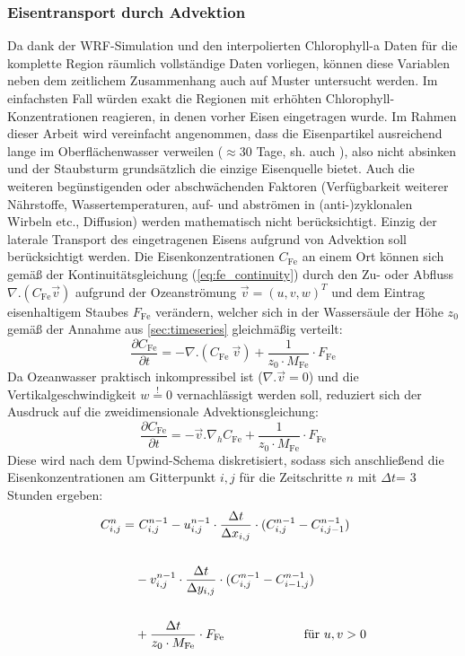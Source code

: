 \documentclass[12pt,a4paper,onecolumn,headheight=30pt]{scrartcl}
\begin{document}
\subsubsection{Eisentransport durch Advektion} \label{sec:methods_advection}
Da dank der WRF-Simulation und den interpolierten Chlorophyll-a Daten \citep{Saulquin.2019} für die komplette Region räumlich vollständige Daten vorliegen, können diese Variablen neben dem zeitlichem Zusammenhang auch auf Muster untersucht werden. Im einfachsten Fall würden exakt die Regionen mit erhöhten Chlorophyll-Konzentrationen reagieren, in denen vorher Eisen eingetragen wurde. Im Rahmen dieser Arbeit wird vereinfacht angenommen, dass die Eisenpartikel ausreichend lange im Oberflächenwasser verweilen ($\approx$30 Tage, sh. auch \citet{Cropp.2013}), also nicht absinken und der Staubsturm grundsätzlich die einzige Eisenquelle bietet. Auch die weiteren begünstigenden oder abschwächenden Faktoren (Verfügbarkeit weiterer Nährstoffe, Wassertemperaturen, auf- und abströmen in (anti-)zyklonalen Wirbeln etc., Diffusion) werden mathematisch nicht berücksichtigt. Einzig der laterale Transport des eingetragenen Eisens aufgrund von Advektion soll berücksichtigt werden. Die Eisenkonzentrationen $C_\text{Fe}$ an einem Ort können sich gemäß der Kontinuitätsgleichung (\ref{eq:fe_continuity}) durch den Zu- oder Abfluss $\nabla . (C_\text{Fe} \vec{v})$ aufgrund der Ozeanströmung $\vec{v} = (u,v,w)^T$  und dem Eintrag eisenhaltigem Staubes $F_\text{Fe}$ verändern, welcher sich in der Wassersäule der Höhe $z_0$ gemäß der Annahme aus \ref{sec:timeseries} gleichmäßig verteilt:
\begin{equation}
\frac{\partial C_\text{Fe}}{\partial t} = - \nabla . (C_\text{Fe} \ \vec{v}) + \frac{1}{z_0 \cdot M_\text{Fe}} \cdot F_\text{Fe} \label{eq:fe_continuity}
\end{equation}
Da Ozeanwasser praktisch inkompressibel ist ($\nabla . \vec{v}=0$) und die Vertikalgeschwindigkeit $w\overset{!}{=}0$ vernachlässigt werden soll, reduziert sich der Ausdruck auf die zweidimensionale Advektionsgleichung:
\begin{equation}
\frac{\partial C_\text{Fe}}{\partial t} = - \vec{v} . \nabla_h  C_\text{Fe}  + \frac{1}{z_0 \cdot M_\text{Fe}} \cdot F_\text{Fe} \label{eq:fe_advection}
\end{equation}
Diese wird nach dem Upwind-Schema diskretisiert, sodass sich anschließend die Eisenkonzentrationen am Gitterpunkt $i,j$ für die Zeitschritte $n$ mit $\Delta t$= 3 Stunden ergeben:
\begin{equation}
\begin{split}
C_{i,j}^n = &\ C_{i,j}^{n-1} - u_{i,j}^{n-1} \cdot \frac{\Delta t}{\Delta x_{i,j}} \cdot (C_{i,j}^{n-1} - C_{i,j-1}^{n-1}) \\\\
&- v_{i,j}^{n-1} \cdot \frac{\Delta t}{\Delta y_{i,j}} \cdot (C_{i,j}^{n-1} - C_{i-1,j}^{n-1})  \\\\
&+ \frac{\Delta t}{z_0 \cdot M_\text{Fe}} \cdot F_\text{Fe} \text{ \qquad  \qquad \qquad für } u,v > 0
\end{split}
\end{equation}
\end{document}
